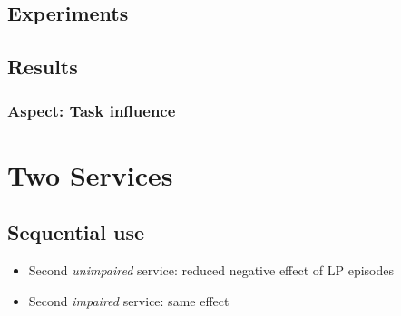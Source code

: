 \subsection{Experiments}


\subsection{Results}

\subsubsection*{Aspect: Task influence}


\section{Two Services}
\subsection{Sequential use}
\begin{itemize}
\item Second \textit{unimpaired} service: reduced negative effect of LP episodes
\item Second \textit{impaired} service: same effect
\end{itemize}

